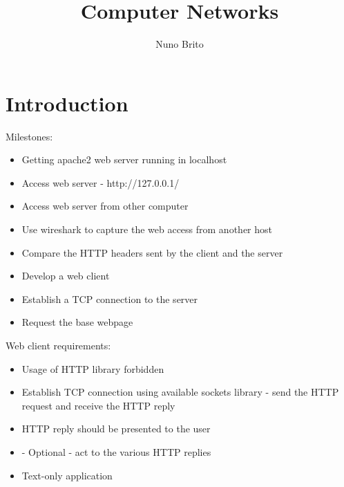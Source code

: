 \documentclass[11pt]{report}
\title{Computer Networks}
\author{Nuno Brito}
\begin{document}
\tableofcontents

\section{Introduction}
Milestones:
\begin{itemize}
    \item Getting apache2 web server running in localhost
    \item Access web server - http://127.0.0.1/
    \item Access web server from other computer
    \item Use wireshark to capture the web access from another host
    \item Compare the HTTP headers sent by the client and the server
    \item Develop a web client
    \item Establish a TCP connection to the server
    \item Request the base webpage
\end{itemize}

Web client requirements:
\begin{itemize}
    \item Usage of HTTP library forbidden
    \item Establish TCP connection using available sockets library - send the HTTP request and receive the HTTP reply
    \item HTTP reply should be presented to the user
    \item - Optional - act to the various HTTP replies
    \item Text-only application
\end{itemize}
\end{document}
